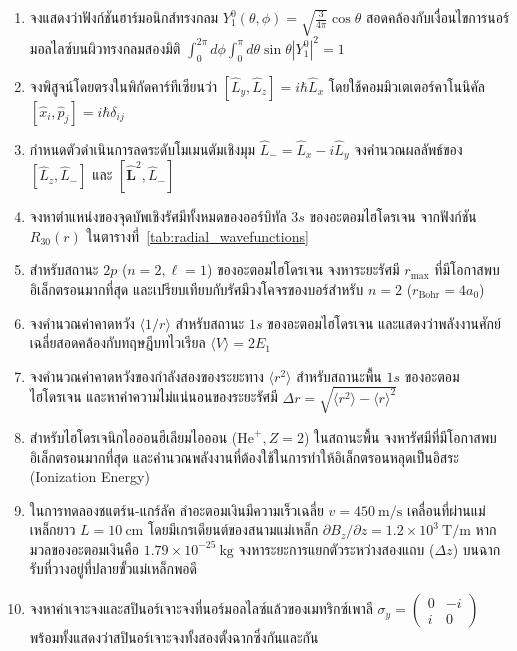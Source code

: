 \begin{enumerate}[label=\textbf{\arabic*.}]
    \item จงแสดงว่าฟังก์ชันฮาร์มอนิกส์ทรงกลม $Y_1^0(\theta, \phi) = \sqrt{\frac{3}{4\pi}}\cos\theta$ สอดคล้องกับเงื่อนไขการนอร์มอลไลซ์บนผิวทรงกลมสองมิติ $\int_0^{2\pi} d\phi \int_0^\pi d\theta \sin\theta |Y_1^0|^2 = 1$
    \item จงพิสูจน์โดยตรงในพิกัดคาร์ทีเซียนว่า $[\hat{L}_y, \hat{L}_z] = i\hbar\hat{L}_x$ โดยใช้คอมมิวเตเตอร์คาโนนิคัล $[\hat{x}_i, \hat{p}_j] = i\hbar\delta_{ij}$
    \item กำหนดตัวดำเนินการลดระดับโมเมนตัมเชิงมุม $\hat{L}_- = \hat{L}_x - i\hat{L}_y$ จงคำนวณผลลัพธ์ของ $[\hat{L}_z, \hat{L}_-]$ และ $[\hat{\mathbf{L}}^2, \hat{L}_-]$
    \item จงหาตำแหน่งของจุดบัพเชิงรัศมีทั้งหมดของออร์บิทัล $3s$ ของอะตอมไฮโดรเจน จากฟังก์ชัน $R_{30}(r)$ ในตารางที่~\ref{tab:radial_wavefunctions}
    \item สำหรับสถานะ $2p$ ($n=2, \ell=1$) ของอะตอมไฮโดรเจน จงหาระยะรัศมี $r_{\text{max}}$ ที่มีโอกาสพบอิเล็กตรอนมากที่สุด และเปรียบเทียบกับรัศมีวงโคจรของบอร์สำหรับ $n=2$ ($r_{\text{Bohr}} = 4a_0$)
    \item จงคำนวณค่าคาดหวัง $\langle 1/r \rangle$ สำหรับสถานะ $1s$ ของอะตอมไฮโดรเจน และแสดงว่าพลังงานศักย์เฉลี่ยสอดคล้องกับทฤษฎีบทไวเรียล $\langle V \rangle = 2E_1$
    \item จงคำนวณค่าคาดหวังของกำลังสองของระยะทาง $\langle r^2 \rangle$ สำหรับสถานะพื้น $1s$ ของอะตอมไฮโดรเจน และหาค่าความไม่แน่นอนของระยะรัศมี $\Delta r = \sqrt{\langle r^2 \rangle - \langle r \rangle^2}$
    \item สำหรับไฮโดรเจนิกไอออนฮีเลียมไอออน ($\text{He}^+, Z=2$) ในสถานะพื้น จงหารัศมีที่มีโอกาสพบอิเล็กตรอนมากที่สุด และคำนวณพลังงานที่ต้องใช้ในการทำให้อิเล็กตรอนหลุดเป็นอิสระ (Ionization Energy)
    \item ในการทดลองชแตร์น-แกร์ลัค ลำอะตอมเงินมีความเร็วเฉลี่ย $v = 450~\text{m/s}$ เคลื่อนที่ผ่านแม่เหล็กยาว $L = 10~\text{cm}$ โดยมีเกรเดียนต์ของสนามแม่เหล็ก $\partial B_z/\partial z = 1.2 \times 10^3~\text{T/m}$ หากมวลของอะตอมเงินคือ $1.79 \times 10^{-25}~\text{kg}$ จงหาระยะการแยกตัวระหว่างสองแถบ ($\Delta z$) บนฉากรับที่วางอยู่ที่ปลายขั้วแม่เหล็กพอดี
    \item จงหาค่าเจาะจงและสปินอร์เจาะจงที่นอร์มอลไลซ์แล้วของเมทริกซ์เพาลี $\sigma_y = \begin{pmatrix} 0 & -i \\ i & 0 \end{pmatrix}$ พร้อมทั้งแสดงว่าสปินอร์เจาะจงทั้งสองตั้งฉากซึ่งกันและกัน

\end{enumerate}
